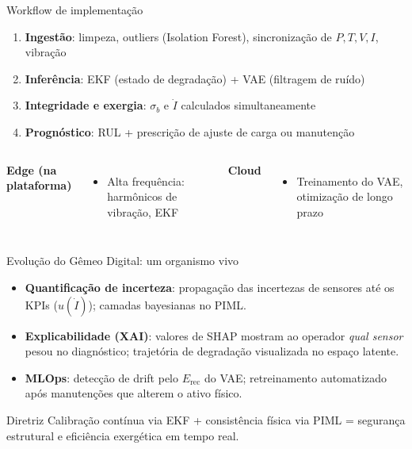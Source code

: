 \documentclass[aspectratio=169,12pt]{beamer}
\begin{document}
\begin{frame}{Workflow de implementação}
	\begin{enumerate}
		\item \textbf{Ingestão}: limpeza, outliers (Isolation Forest), sincronização de $P, T, V, I$, vibração
		\item \textbf{Inferência}: EKF (estado de degradação) + VAE (filtragem de ruído)
		\item \textbf{Integridade e exergia}: $\sigma_b$ e $\dot{I}$ calculados simultaneamente
		\item \textbf{Prognóstico}: RUL + prescrição de ajuste de carga ou manutenção
	\end{enumerate}
	\vfill
	\begin{columns}[T]
		\textbf{Edge (na plataforma)}
		\begin{itemize}
			\item Alta frequência: harmônicos de vibração, EKF
		\end{itemize}
		\textbf{Cloud}
		\begin{itemize}
			\item Treinamento do VAE, otimização de longo prazo
		\end{itemize}
	\end{columns}
\end{frame}

\begin{frame}{Evolução do Gêmeo Digital: um organismo vivo}
	\begin{itemize}
		\item \textbf{Quantificação de incerteza}: propagação das incertezas de sensores até os KPIs ($u(\dot{I})$); camadas bayesianas no PIML.
		\item \textbf{Explicabilidade (XAI)}: valores de SHAP mostram ao operador \textit{qual sensor} pesou no diagnóstico; trajetória de degradação visualizada no espaço latente.
		\item \textbf{MLOps}: detecção de drift pelo $E_{\text{rec}}$ do VAE; retreinamento automatizado após manutenções que alterem o ativo físico.
	\end{itemize}
	\vfill
	\begin{alertblock}{Diretriz}
		Calibração contínua via EKF + consistência física via PIML = segurança estrutural e eficiência exergética em tempo real.
	\end{alertblock}
\end{frame}
\end{document}
